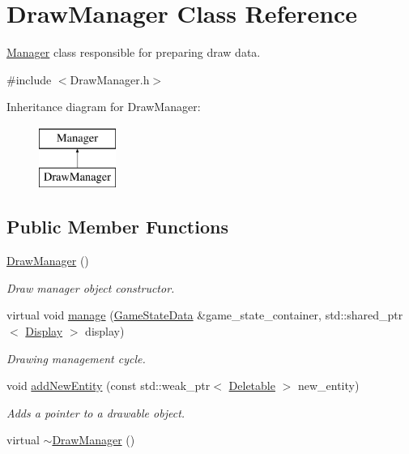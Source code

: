 \hypertarget{classDrawManager}{\section{Draw\-Manager Class Reference}
\label{classDrawManager}
}


\hyperlink{classManager}{Manager} class responsible for preparing draw data.  




{\ttfamily \#include $<$Draw\-Manager.\-h$>$}

Inheritance diagram for Draw\-Manager\-:\begin{figure}[H]
\begin{center}
\leavevmode
\includegraphics[height=2.000000cm]{classDrawManager}
\end{center}
\end{figure}
\subsection*{Public Member Functions}
\begin{DoxyCompactItemize}
\item 
\hyperlink{classDrawManager_a9a1e8b606471661af565479f7366bf21}{Draw\-Manager} ()
\begin{DoxyCompactList}\small\item\em Draw manager object constructor. \end{DoxyCompactList}\item 
virtual void \hyperlink{classDrawManager_a2c48a7d348b9f6961f2b615015dc482f}{manage} (\hyperlink{classGameStateData}{Game\-State\-Data} \&game\-\_\-state\-\_\-container, std\-::shared\-\_\-ptr$<$ \hyperlink{classDisplay}{Display} $>$ display)
\begin{DoxyCompactList}\small\item\em Drawing management cycle. \end{DoxyCompactList}\item 
void \hyperlink{classDrawManager_aea3804a9564e6185eec3750f5ff4e33f}{add\-New\-Entity} (const std\-::weak\-\_\-ptr$<$ \hyperlink{classDeletable}{Deletable} $>$ new\-\_\-entity)
\begin{DoxyCompactList}\small\item\em Adds a pointer to a drawable object. \end{DoxyCompactList}\item 
virtual \hyperlink{classDrawManager_ab2cbca4d18cb8838662754bb01585a9a}{$\sim$\-Draw\-Manager} ()
\end{DoxyCompactItemize}
